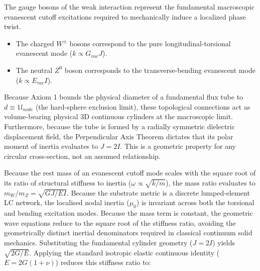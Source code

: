 The gauge bosons of the weak interaction represent the fundamental macroscopic evanescent cutoff excitations required to mechanically induce a localized phase twist.

\begin{itemize}
\item The charged $W^{\pm}$ bosons correspond to the pure longitudinal-torsional evanescent mode ($k\propto G_{vac}J$).
\item The neutral $Z^{0}$ boson corresponds to the transverse-bending evanescent mode ($k\propto E_{vac}I$).
\end{itemize}

Because Axiom 1 bounds the physical diameter of a fundamental flux tube to $d \equiv 1 l_{node}$ (the hard-sphere exclusion limit), these topological connections act as volume-bearing physical 3D continuous cylinders at the macroscopic limit. Furthermore, because the tube is formed by a radially symmetric dielectric displacement field, the Perpendicular Axis Theorem dictates that its polar moment of inertia evaluates to $J=2I$. This is a geometric property for any circular cross-section, not an assumed relationship.

Because the rest mass of an evanescent cutoff mode scales with the square root of its ratio of structural stiffness to inertia ($\omega \propto \sqrt{k/m}$), the mass ratio evaluates to $m_W/m_Z = \sqrt{GJ / EI}$. Because the substrate metric is a discrete lumped-element LC network, the localised nodal inertia ($\mu_0$) is invariant across both the torsional and bending excitation modes. Because the mass term is constant, the geometric wave equations reduce to the square root of the stiffness ratio, avoiding the geometrically distinct inertial denominators required in classical continuum solid mechanics. Substituting the fundamental cylinder geometry ($J=2I$) yields $\sqrt{2G/E}$. Applying the standard isotropic elastic continuous identity ($E = 2G(1+\nu)$) reduces this stiffness ratio to:

